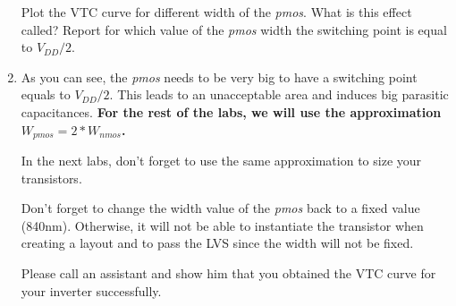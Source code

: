 \begin{enumerate}
	
	\begin{exercise} \label{ex4}
		Plot the VTC curve for different width of the \textit{pmos}. What is this effect called? Report for which value of the \textit{pmos} width the switching point is equal to $V_{DD}/2$.
	\end{exercise}
	\item As you can see, the \textit{pmos} needs to be very big to have a switching point equals to $V_{DD}/2$. This leads to an unacceptable area and induces big parasitic capacitances. \textbf{For the rest of the labs, we will use the approximation $W_{pmos}=2*W_{nmos}$.}
	
	\begin{remark}
		In the next labs, don't forget to use the same approximation to size your transistors.
	\end{remark}
	\begin{warning}
		Don't forget to change the width value of the \textit{pmos} back to a fixed value (840nm). Otherwise, it will not be able to instantiate the transistor when creating a layout and to pass the LVS since the width will not be fixed.
	\end{warning}

\begin{checkpoint}\label{check2}
	Please call an assistant and show him that you obtained the VTC curve for your inverter successfully.
\end{checkpoint}	


\end{enumerate}

